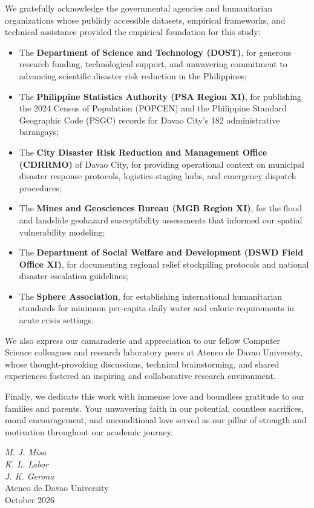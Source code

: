 We gratefully acknowledge the governmental agencies and humanitarian organizations whose publicly accessible datasets, empirical frameworks, and technical assistance provided the empirical foundation for this study:
\begin{itemize}
    \item The \textbf{Department of Science and Technology (DOST)}, for generous research funding, technological support, and unwavering commitment to advancing scientific disaster risk reduction in the Philippines;
    \item The \textbf{Philippine Statistics Authority (PSA Region XI)}, for publishing the 2024 Census of Population (POPCEN) and the Philippine Standard Geographic Code (PSGC) records for Davao City's 182 administrative barangays;
    \item The \textbf{City Disaster Risk Reduction and Management Office (CDRRMO)} of Davao City, for providing operational context on municipal disaster response protocols, logistics staging hubs, and emergency dispatch procedures;
    \item The \textbf{Mines and Geosciences Bureau (MGB Region XI)}, for the flood and landslide geohazard susceptibility assessments that informed our spatial vulnerability modeling;
    \item The \textbf{Department of Social Welfare and Development (DSWD Field Office XI)}, for documenting regional relief stockpiling protocols and national disaster escalation guidelines;
    \item The \textbf{Sphere Association}, for establishing international humanitarian standards for minimum per-capita daily water and caloric requirements in acute crisis settings.
\end{itemize}

We also express our camaraderie and appreciation to our fellow Computer Science colleagues and research laboratory peers at Ateneo de Davao University, whose thought-provoking discussions, technical brainstorming, and shared experiences fostered an inspiring and collaborative research environment.

Finally, we dedicate this work with immense love and boundless gratitude to our families and parents. Your unwavering faith in our potential, countless sacrifices, moral encouragement, and unconditional love served as our pillar of strength and motivation throughout our academic journey. 

\vspace{2em}
\begin{flushright}
\textit{M. J. Misa} \\
\textit{K. L. Labor} \\
\textit{J. K. Gerona} \\
\vspace{1ex}
Ateneo de Davao University \\
October 2026
\end{flushright}
